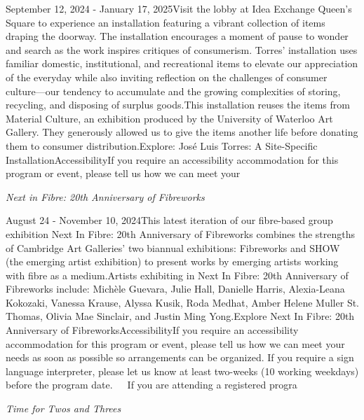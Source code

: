 \documentclass[letterpaper, 10pt]{article}
\newcommand{\subtitle}[1]{\textit{\large #1}\vspace{0.5em}}
\newcommand{\articlecontent}[1]{\small #1\vspace{1em}}
\begin{document}
\begin{multicols}{2}
{September 12, 2024 - January 17, 2025Visit the lobby at Idea Exchange Queen's Square to experience an installation featuring a vibrant collection of items draping the doorway. The installation encourages a moment of pause to wonder and search as the work inspires critiques of consumerism. Torres’ installation uses familiar domestic, institutional, and recreational items to elevate our appreciation of the everyday while also inviting reflection on the challenges of consumer culture—our tendency to accumulate and the growing complexities of storing, recycling, and disposing of surplus goods.This installation reuses the items from Material Culture, an exhibition produced by the University of Waterloo Art Gallery. They generously allowed us to give the items another life before donating them to consumer distribution.Explore: José Luis Torres: A Site-Specific InstallationAccessibilityIf you require an accessibility accommodation for this program or event, please tell us how we can meet your
}
\vspace{10px}

\subtitle{Next in Fibre: 20th Anniversary of Fibreworks}

\articlecontent{

\qrcode[height=1.5cm]{https://ideaexchange.libnet.info/event/11807115}
\vspace{10px}

August 24 - November 10, 2024This latest iteration of our fibre-based group exhibition Next In Fibre: 20th Anniversary of Fibreworks combines the strengths of Cambridge Art Galleries’ two biannual exhibitions: Fibreworks and SHOW (the emerging artist exhibition) to present works by emerging artists working with fibre as a medium.Artists exhibiting in Next In Fibre: 20th Anniversary of Fibreworks include: Michèle Guevara, Julie Hall, Danielle Harris, Alexia-Leana Kokozaki, Vanessa Krause, Alyssa Kusik, Roda Medhat, Amber Helene Muller St. Thomas, Olivia Mae Sinclair, and Justin Ming Yong.Explore Next In Fibre: 20th Anniversary of FibreworksAccessibilityIf you require an accessibility accommodation for this program or event, please tell us how we can meet your needs as soon as possible so arrangements can be organized. If you require a sign language interpreter, please let us know at least two-weeks (10 working weekdays) before the program date.   If you are attending a registered progra
}
\vspace{10px}

\subtitle{Time for Twos and Threes}

\articlecontent{

}
\end{multicols}
\end{document}
